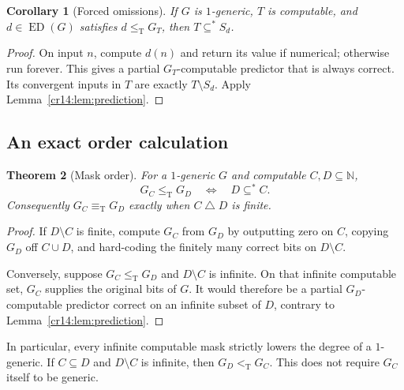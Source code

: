 \documentclass[11pt,a4paper]{article}
\newcommand{\N}{\mathbb N}
\newcommand{\leT}{\leq_{\mathrm T}}
\newcommand{\eqT}{\equiv_{\mathrm T}}
\newcommand{\ltT}{<_{\mathrm T}}
\newcommand{\ED}{\operatorname{ED}}
\newcommand{\substar}{\subseteq^{*}}
\newcommand{\symdiff}{\mathbin{\triangle}}
\newtheorem{theorem}{Theorem}[section]
\newtheorem{corollary}[theorem]{Corollary}
\theoremstyle{definition}
\theoremstyle{remark}
\begin{document}
\begin{corollary}[Forced omissions]\label{cr14:cor:omissions}
If $G$ is $1$-generic, $T$ is computable, and
$d\in\ED(G)$ satisfies $d\leT G_T$, then $T\substar S_d$.
\end{corollary}
\begin{proof}
On input $n$, compute $d(n)$ and return its value if numerical; otherwise
run forever. This gives a partial $G_T$-computable predictor that is always
correct. Its convergent inputs in $T$ are exactly $T\setminus S_d$.
Apply Lemma~\ref{cr14:lem:prediction}.
\end{proof}

\subsection{An exact order calculation}
\begin{theorem}[Mask order]\label{cr14:thm:maskorder}
For a $1$-generic $G$ and computable $C,D\subseteq\N$,
\begin{equation}\label{cr14:eq:maskorder}
 G_C\leT G_D\quad\Longleftrightarrow\quad D\substar C.
\end{equation}
Consequently $G_C\eqT G_D$ exactly when $C\symdiff D$ is finite.
\end{theorem}
\begin{proof}
If $D\setminus C$ is finite, compute $G_C$ from $G_D$ by outputting zero
on $C$, copying $G_D$ off $C\cup D$, and hard-coding the finitely many
correct bits on $D\setminus C$.

Conversely, suppose $G_C\leT G_D$ and $D\setminus C$ is infinite.
On that infinite computable set, $G_C$ supplies the original bits of $G$.
It would therefore be a partial $G_D$-computable predictor correct on an
infinite subset of $D$, contrary to Lemma~\ref{cr14:lem:prediction}.
\end{proof}

In particular, every infinite computable mask strictly lowers the degree
of a $1$-generic. If $C\subseteq D$ and $D\setminus C$ is infinite, then
$G_D\ltT G_C$. This does not require $G_C$ itself to be generic.
\end{document}
